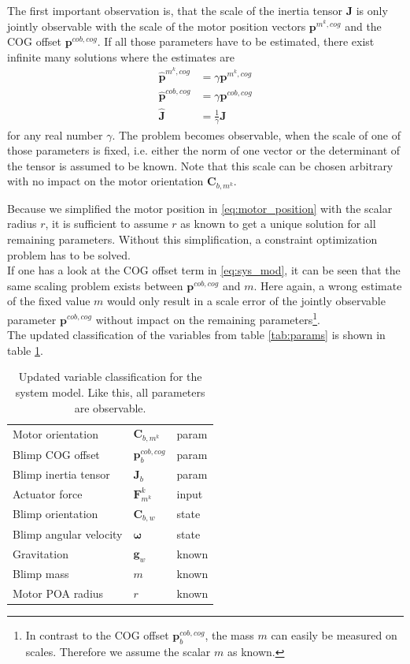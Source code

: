 The first important observation is, that the scale of the inertia tensor $\mathbf{J}$ is only jointly observable with the scale of the motor position vectors $\mathbf{p}^{m^k,cog}$ and the COG offset $\mathbf{p}^{cob,cog}$.
If all those parameters have to be estimated, there exist infinite many solutions where the estimates are
\begin{align*}
 \hat{\mathbf{p}}^{m^k,cog} &= \gamma \mathbf{p}^{m^k,cog} \\
 \hat{\mathbf{p}}^{cob,cog} &= \gamma \mathbf{p}^{cob,cog} \\
 \hat{\mathbf{J}}           &= \frac{1}{\gamma} \mathbf{J}
\end{align*}
for any real number $\gamma$.
The problem becomes observable, when the scale of one of those parameters is fixed, i.e. either the norm of one vector or the determinant of the tensor is assumed to be known.
Note that this scale can be chosen arbitrary with no impact on the motor orientation $\mathbf{C}_{b,m^k}$.

Because we simplified the motor position in \cref{eq:motor_position} with the scalar radius $r$, it is sufficient to assume $r$ as known to get a unique solution for all remaining parameters.
Without this simplification, a constraint optimization problem has to be solved.
\\

If one has a look at the COG offset term in \cref{eq:sys_mod}, it can be seen that the same scaling problem exists between $\mathbf{p}^{cob,cog}$ and $m$.
Here again, a wrong estimate of the fixed value $m$
would only result in a scale error of the jointly observable parameter $\mathbf{p}^{cob,cog}$ without impact on the remaining parameters\footnote{
In contrast to the COG offset $\mathbf{p}^{cob,cog}_{b}$, the mass $m$ can easily be measured on scales. Therefore we assume the scalar $m$ as known.}.
\\
The updated classification of the variables from table \ref{tab:params} is shown in table \ref{tab:params_updated}.

\begin{table}[htb!]
\centering
\begin{tabular}{lll}
\hline
Motor orientation & $\mathbf{C}_{b,m^k}$ 	& param \\
Blimp COG offset & $\mathbf{p}^{cob,cog}_b$ & param \\
Blimp inertia tensor & $\mathbf{J}_b$ 		& param \\
Actuator force & $\mathbf{F}_{m^k}^k$ 			& input \\
Blimp orientation & $\mathbf{C}_{b,w}$ 		& state \\
Blimp angular velocity & $\boldsymbol{\omega}$ & state \\
Gravitation & $\mathbf{g}_w$ 				& known \\
Blimp mass & $m$ 							& known \\
Motor POA radius & $r$ 						& known \\
\hline
\end{tabular}
\caption{Updated variable classification for the system model. Like this, all parameters are observable.}
\label{tab:params_updated}
\end{table}


